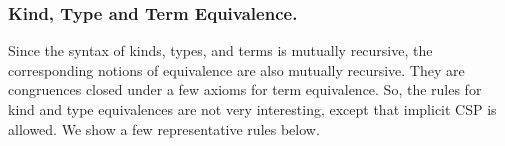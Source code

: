 \subsubsection{Kind, Type and Term Equivalence.}

Since the syntax of kinds, types, and terms is mutually recursive,
the corresponding notions of equivalence are also mutually recursive.
They are congruences closed under a few axioms for term equivalence.
So, the rules for kind and type equivalences are not very interesting, 
except that implicit CSP is allowed.
We show a few representative rules below.

  {\small
    \begin{center}
      \hfil
      \\[2mm]
    \end{center}
  }



